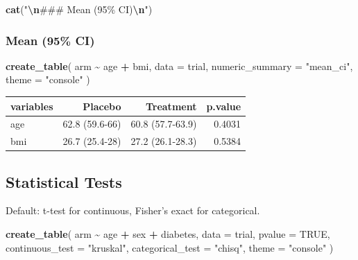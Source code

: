 \documentclass[
]{article}
\newenvironment{Shaded}{\begin{snugshade}}{\end{snugshade}}
\newcommand{\AttributeTok}[1]{\textcolor[rgb]{0.13,0.29,0.53}{#1}}
\newcommand{\ConstantTok}[1]{\textcolor[rgb]{0.56,0.35,0.01}{#1}}
\newcommand{\FunctionTok}[1]{\textcolor[rgb]{0.13,0.29,0.53}{\textbf{#1}}}
\newcommand{\NormalTok}[1]{#1}
\newcommand{\SpecialCharTok}[1]{\textcolor[rgb]{0.81,0.36,0.00}{\textbf{#1}}}
\newcommand{\StringTok}[1]{\textcolor[rgb]{0.31,0.60,0.02}{#1}}
\begin{document}
\begin{Shaded}
\begin{Highlighting}[]
\FunctionTok{cat}\NormalTok{(}\StringTok{"}\SpecialCharTok{\textbackslash{}n}\StringTok{\#\#\# Mean (95\% CI)}\SpecialCharTok{\textbackslash{}n}\StringTok{"}\NormalTok{)}
\end{Highlighting}
\end{Shaded}

\subsubsection{Mean (95\% CI)}\label{mean-95-ci}

\begin{Shaded}
\begin{Highlighting}[]
\FunctionTok{create\_table}\NormalTok{(}
\NormalTok{  arm }\SpecialCharTok{\textasciitilde{}}\NormalTok{ age }\SpecialCharTok{+}\NormalTok{ bmi, }\AttributeTok{data =}\NormalTok{ trial,}
  \AttributeTok{numeric\_summary =} \StringTok{"mean\_ci"}\NormalTok{, }\AttributeTok{theme =} \StringTok{"console"}
\NormalTok{)}
\end{Highlighting}
\end{Shaded}

\begin{tabular}{lrrr}
\hline
variables & Placebo & Treatment & p.value \\
\hline
age & 62.8 (59.6-66) & 60.8 (57.7-63.9) & 0.4031 \\
bmi & 26.7 (25.4-28) & 27.2 (26.1-28.3) & 0.5384 \\
\hline
\end{tabular}

\subsection{Statistical Tests}\label{statistical-tests}

Default: t-test for continuous, Fisher's exact for categorical.

\begin{Shaded}
\begin{Highlighting}[]
\FunctionTok{create\_table}\NormalTok{(}
\NormalTok{  arm }\SpecialCharTok{\textasciitilde{}}\NormalTok{ age }\SpecialCharTok{+}\NormalTok{ sex }\SpecialCharTok{+}\NormalTok{ diabetes,}
  \AttributeTok{data =}\NormalTok{ trial,}
  \AttributeTok{pvalue =} \ConstantTok{TRUE}\NormalTok{,}
  \AttributeTok{continuous\_test =} \StringTok{"kruskal"}\NormalTok{,}
  \AttributeTok{categorical\_test =} \StringTok{"chisq"}\NormalTok{,}
  \AttributeTok{theme =} \StringTok{"console"}
\NormalTok{)}
\end{Highlighting}
\end{Shaded}
\end{document}
